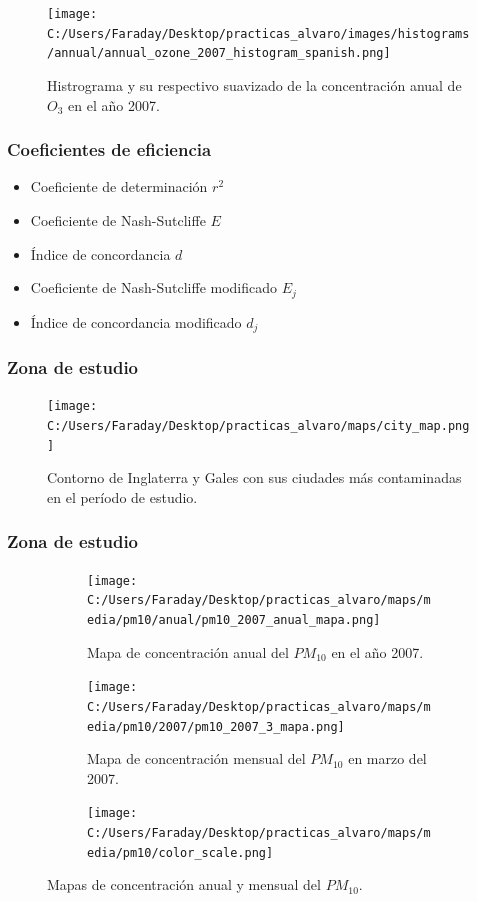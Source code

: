 \documentclass[12pt]{beamer}
\begin{document}
\begin{frame}
\tiny
\begin{figure}[H]
\centering
\texttt{[image: C:/Users/Faraday/Desktop/practicas\_alvaro/images/histograms/annual/annual\_ozone\_2007\_histogram\_spanish.png]}
\caption{Histrograma y su respectivo suavizado de la concentración anual de $O_{3}$ en el año 2007.}
\label{fig:hist-ejem-1}
\end{figure}
\end{frame}

\begin{frame}
\frametitle{Coeficientes de eficiencia}
\begin{itemize}
\item<1-> Coeficiente de determinación $r^{2}$
\item<2-> Coeficiente de Nash-Sutcliffe $E$
\item<3-> Índice de concordancia $d$
\item<4-> Coeficiente de Nash-Sutcliffe modificado $E_{j}$
\item<5-> Índice de concordancia modificado $d_{j}$
\end{itemize}
\end{frame}

\begin{frame}
\frametitle{Zona de estudio}
\tiny
\begin{figure}[H]
\centering
\texttt{[image: C:/Users/Faraday/Desktop/practicas\_alvaro/maps/city\_map.png]}
\caption{Contorno de Inglaterra y Gales con sus ciudades más contaminadas en el período de estudio.}
\label{fig:map-city}
\end{figure}
\end{frame}

\begin{frame}
\frametitle{Zona de estudio}
\tiny
\begin{figure}[H]
\centering
\begin{subfigure}[H]{0.45\textwidth}
\texttt{[image: C:/Users/Faraday/Desktop/practicas\_alvaro/maps/media/pm10/anual/pm10\_2007\_anual\_mapa.png]}
\caption{Mapa de concentración anual del $PM_{10}$ en el año 2007.}
\label{fig:map-ejem-1}
\end{subfigure}
%
\begin{subfigure}[H]{0.45\textwidth}
\texttt{[image: C:/Users/Faraday/Desktop/practicas\_alvaro/maps/media/pm10/2007/pm10\_2007\_3\_mapa.png]}
\caption{Mapa de concentración mensual del $PM_{10}$ en marzo del 2007.}
\label{fig:map-ejem-2}
\end{subfigure}

\begin{subfigure}[H]{0.45\textwidth}
\texttt{[image: C:/Users/Faraday/Desktop/practicas\_alvaro/maps/media/pm10/color\_scale.png]}
\captionsetup{labelformat=empty}
\caption{}
\end{subfigure}
\caption{Mapas de concentración anual y mensual del $PM_{10}$.}
\end{figure}
\end{frame}
\end{document}
